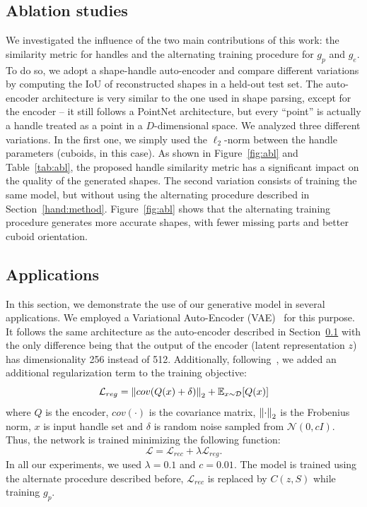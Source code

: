 \subsection{Ablation studies}
\label{sec:ablation}
We investigated the influence of the two main contributions of this work:
the similarity metric for handles and the alternating training procedure for $g_p$ and $g_e$.
To do so, we adopt a shape-handle auto-encoder and compare different variations by computing
the IoU of reconstructed shapes in a held-out test set.
The auto-encoder architecture is very similar to the one used in shape parsing, except for
the encoder -- it still follows a PointNet architecture, but every ``point'' is actually
a handle treated as a point in a $D$-dimensional space.
We analyzed three different variations.
In the first one, we simply used the $\ell_2$-norm between the handle parameters (cuboids, in this case).
As shown in Figure~\ref{fig:abl} and Table~\ref{tab:abl},
the proposed handle similarity metric has a significant impact on the quality of the
generated shapes.
The second variation consists of training the same model, but without using the alternating procedure
described in Section~\ref{hand:method}. %
Figure~\ref{fig:abl} shows that the alternating training procedure generates
more accurate shapes, with fewer missing parts and better cuboid orientation.


\subsection{Applications}
\label{sec:applications}
In this section, we demonstrate the use of our generative model in several applications.
We employed a Variational Auto-Encoder (VAE)~\cite{vae} for this purpose.
It follows the same architecture as the auto-encoder described in Section~\ref{sec:ablation} with the 
only difference being that the output of the encoder (latent representation $z$) has
dimensionality 256 instead of 512.
Additionally, following~\cite{mrt18}, we added an additional regularization term to the training objective:
\begin{equation}
    \mathcal{L}_{reg} = \left\lVert cov(Q(x) + \delta)\right\rVert_2 + \mathbb{E}_{x\sim\mathcal{D}}[Q(x)]
\end{equation}
where $Q$ is the encoder, $cov(\cdot)$ is the covariance matrix, $\left\lVert\cdot\right\rVert_2$ is the Frobenius norm, $x$ is input handle set and $\delta$ is random noise sampled from $\mathcal{N}(0,cI)$.
Thus, the network is trained minimizing the following function:
\begin{equation}
    \mathcal{L} = \mathcal{L}_{rec} + \lambda\mathcal{L}_{reg}.
\end{equation}
In all our experiments, we used $\lambda=0.1$ and $c=0.01$.
The model is trained using the alternate procedure described before, \ie $\mathcal{L}_{rec}$ is replaced by $C(z,S)$ while training $g_p$.

